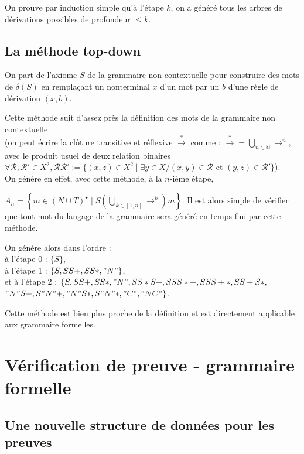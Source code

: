 \documentclass[a4paper,12pt]{article}
\begin{document}
On prouve par induction simple qu'à l'étape $k$, on a généré tous les arbres de dérivations possibles de profondeur $\leq k$.

\subsection{La méthode top-down}

On part de l'axiome $S$ de la grammaire non contextuelle pour construire des mots de $\delta(S)$ en remplaçant un nonterminal $x$ d'un mot par un $b$ d'une règle de dérivation $(x,b)$.

Cette méthode suit d'assez près la définition des mots de la grammaire non contextuelle\\
(on peut écrire la clôture transitive et réflexive $\overset{*}{\rightarrow}$ comme :
$\overset{*}{\rightarrow} = \bigcup_{n \in \mathbb{N}} \rightarrow ^n$, avec le produit usuel de deux relation binaires $\forall \mathcal{R}, \mathcal{R}' \in X^2, \mathcal{R} \mathcal{R'} := \{(x,z) \in X^2 \mid \exists y \in X / (x,y) \in \mathcal{R} \text{ et } (y,z) \in \mathcal{R}'\} $).\\
On génère en effet, avec cette méthode, à la $n$-ième étape, 

$A_n = \left\{m \in (N \cup T)^\star \mid  S \left(\bigcup_{k \in [1,n]} \rightarrow^k\right) m\right\}$.
Il est alors simple de vérifier que tout mot du langage de la grammaire sera généré en temps fini par cette méthode.

On génère alors dans l'ordre :\\
à l'étape 0 : $\{S\}$, \\
à l'étape 1 : $\{S,SS+,SS*,"N"\}$,\\
et à l'étape 2 : $\{S,SS+,SS*,"N",SS*S+,SSS*+,SSS+*,SS+S*,$ \\
$"N"S+,S"N"+,"N"S*,S"N"*,"C","NC"\}$.

Cette méthode est bien plus proche de la définition et est directement applicable aux grammaire formelles.

\section{Vérification de preuve - grammaire formelle}

\subsection{Une nouvelle structure de données pour les preuves}
\end{document}
